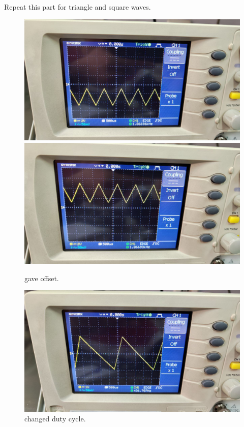 \documentclass[11pt]{article}
\newcommand{\PicScale}{0.2}
\begin{document}
\begin{question}
\begin{subquestion}{Repeat this part for triangle and square waves.}
{            \begin{figure}[H]
                \begin{center}
                    \includegraphics[scale=0.1]{Fig/10.jpeg}
                    \includegraphics[scale=0.1]{Fig/11.jpeg}
                    \caption{gave offset.}
                \end{center}
            \end{figure}

            \begin{figure}[H]
                \begin{center}
                    \includegraphics[scale=\PicScale]{Fig/12.jpeg}
                    \caption{changed duty cycle.}
                \end{center}
            \end{figure}

}
\end{subquestion}
\end{question}
\end{document}
